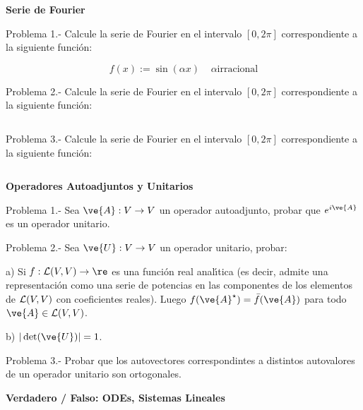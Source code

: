 \documentclass{article}
\begin{document}
\begin{center}
  \textbf{Serie de Fourier}
\end{center}

Problema 1.- Calcule la serie de Fourier en el intervalo $[0,2\pi]$ 
correspondiente a la siguiente funci\'on:

\begin{equation}
  f(x) := \sin(\alpha x) \;\;\;\; \alpha \mbox{irracional}
\end{equation}


Problema 2.- Calcule la serie de Fourier en el intervalo $[0,2\pi]$ 
correspondiente a la siguiente funci\'on:

\begin{equation}
 
\end{equation}



Problema 3.- Calcule la serie de Fourier en el intervalo $[0,2\pi]$ 
correspondiente a la siguiente funci\'on:

\begin{equation}
 
\end{equation}


\newpage

\begin{center}
  \textbf{Operadores Autoadjuntos y Unitarios}
\end{center}

Problema 1.- Sea $\ve{A} : V \to V$ un operador autoadjunto, probar que
$e^{i\ve{A}}$ es un operador unitario.

Problema 2.- Sea $\ve{U} : V \to V$ un operador unitario, probar:

a) Si $f:{\cal{L}}(V,V) \to \re$ es una funci\'on real anal\'\i{}tica
(es decir, admite una representaci\'on como una serie de potencias en las
componentes de los elementos de ${\cal{L}}(V,V)$ con coeficientes reales).
Luego $f(\ve{A}^{\star}) = \bar{f}(\ve{A})$ para todo 
$\ve{A} \in {\cal{L}}(V,V)$.

b) $|\det(\ve{U})| = 1$.

Problema 3.- Probar que los autovectores correspondintes a distintos autovalores de un operador unitario son ortogonales.



\newpage


\begin{center}
  \textbf{Verdadero / Falso: ODEs, Sistemas Lineales}
\end{center}
\end{document}
